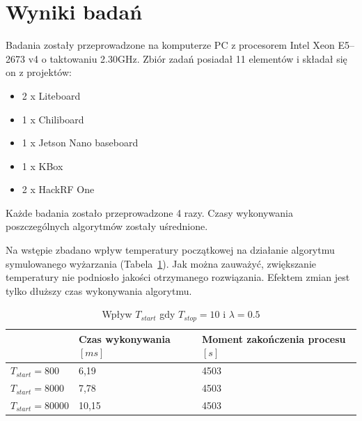 \section{Wyniki badań}
Badania zostały przeprowadzone na komputerze PC z procesorem Intel Xeon E5--2673 v4 o taktowaniu 2.30GHz. Zbiór zadań posiadał 11 elementów i składał się on z projektów:
\begin{itemize}
	\item 2 x Liteboard
	\item 1 x Chiliboard
	\item 1 x Jetson Nano baseboard
	\item 1 x KBox
	\item 2 x HackRF One
\end{itemize}

Każde badania zostało przeprowadzone 4 razy. Czasy wykonywania poszczególnych algorytmów zostały uśrednione.

Na wstępie zbadano wpływ temperatury początkowej na działanie algorytmu symulowanego wyżarzania (Tabela~\ref{tstart_sa}). Jak można zauważyć, zwiększanie temperatury nie podniosło jakości otrzymanego rozwiązania. Efektem zmian jest tylko dłuższy czas wykonywania algorytmu.

\begin{table}[H]
	\centering
	\label{tstart_sa}
	\caption{Wpływ $T_{start}$ gdy $T_{stop}=10$ i $\lambda=0.5$}
	\begin{tabular}{lll}
		\toprule
		                  & Czas wykonywania $[ms]$ & Moment zakończenia procesu $[s]$ \\
		\midrule
		$T_{start}=800$   & 6,19                   & 4503                             \\
		$T_{start}=8000$  & 7,78                   & 4503                             \\
		$T_{start}=80000$ & 10,15                  & 4503                             \\
		\bottomrule
	\end{tabular}
\end{table}

